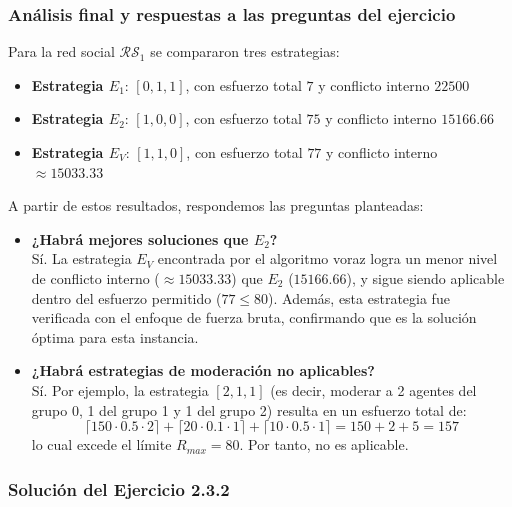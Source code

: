 \documentclass[11pt,letter]{article}
\begin{document}
\subsubsection*{Análisis final y respuestas a las preguntas del ejercicio}

Para la red social $\mathcal{RS}_1$ se compararon tres estrategias:

\begin{itemize}
    \item \textbf{Estrategia $E_1$}: $[0, 1, 1]$, con esfuerzo total $7$ y conflicto interno $22500$
    \item \textbf{Estrategia $E_2$}: $[1, 0, 0]$, con esfuerzo total $75$ y conflicto interno $15166.66$
    \item \textbf{Estrategia $E_V$}: $[1, 1, 0]$, con esfuerzo total $77$ y conflicto interno $\approx 15033.33$
\end{itemize}

A partir de estos resultados, respondemos las preguntas planteadas:

\begin{itemize}
    \item \textbf{¿Habrá mejores soluciones que $E_2$?} \\
    Sí. La estrategia $E_V$ encontrada por el algoritmo voraz logra un menor nivel de conflicto interno ($\approx 15033.33$) que $E_2$ ($15166.66$), y sigue siendo aplicable dentro del esfuerzo permitido ($77 \leq 80$). Además, esta estrategia fue verificada con el enfoque de fuerza bruta, confirmando que es la solución óptima para esta instancia.

    \item \textbf{¿Habrá estrategias de moderación no aplicables?} \\
    Sí. Por ejemplo, la estrategia $[2, 1, 1]$ (es decir, moderar a 2 agentes del grupo 0, 1 del grupo 1 y 1 del grupo 2) resulta en un esfuerzo total de:
    \[
    \lceil 150 \cdot 0.5 \cdot 2 \rceil + \lceil 20 \cdot 0.1 \cdot 1 \rceil + \lceil 10 \cdot 0.5 \cdot 1 \rceil = 150 + 2 + 5 = 157
    \]
    lo cual excede el límite $R_{max} = 80$. Por tanto, no es aplicable.

\end{itemize}



\subsubsection{Solución del Ejercicio 2.3.2}
\end{document}
